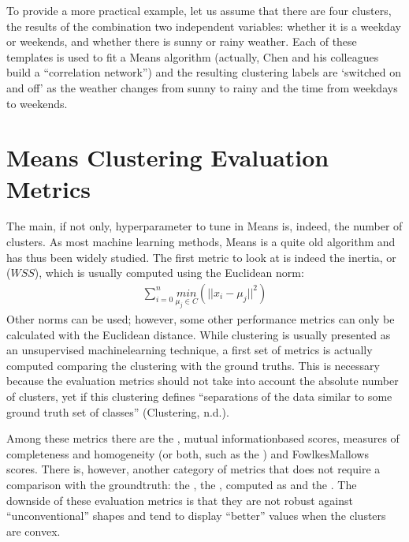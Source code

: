 \documentclass[letterpaper,10pt,english]{jupyterBook}
\begin{document}
\sphinxAtStartPar
To provide a more practical example, let us assume that there are four clusters, the results of the combination two independent variables: whether it is a weekday or weekends, and whether there is sunny or rainy weather. Each of these templates is used to fit a \sphinxhyphen{}Means algorithm (actually, Chen and his colleagues build a “correlation network”) and the resulting clustering labels are ‘switched on and off’ as the weather changes from sunny to rainy and the time from weekdays to weekends.


\section{\sphinxhyphen{}Means Clustering Evaluation Metrics}
\label{\detokenize{04-stations_kmeans:k-means-clustering-evaluation-metrics}}
\sphinxAtStartPar
The main, if not only, hyperparameter to tune in \sphinxhyphen{}Means is, indeed, the number of clusters.
As most machine learning methods, \sphinxhyphen{}Means is a quite old algorithm and has thus been widely studied.
The first metric to look at is indeed the inertia, or  (\(WSS\)), which is usually computed using the Euclidean norm:
\begin{equation*}
\begin{split}
\sum_{i=0}^{n}\underset{\mu_{j}\in{C}}{min}(||x_{i} - \mu_{j}||^2)
\end{split}
\end{equation*}
\sphinxAtStartPar
Other norms can be used; however, some other performance metrics can only be calculated with the Euclidean distance. While clustering is usually presented as an unsupervised machine\sphinxhyphen{}learning technique, a first set of metrics is actually computed comparing the clustering with the ground truths. This is necessary because the evaluation metrics should not take into account the absolute number of clusters, yet if this clustering defines “separations of the data similar to some ground truth set of classes” (Clustering, n.d.).

\sphinxAtStartPar
Among these metrics there are the , mutual information\sphinxhyphen{}based scores, measures of completeness and homogeneity (or both, such as the ) and Fowlkes\sphinxhyphen{}Mallows scores. There is, however, another category of metrics that does not require a comparison with the ground\sphinxhyphen{}truth: the , the , computed as  and  the . The downside of these evaluation metrics is that they are not robust against “unconventional” shapes and tend to display “better” values when the clusters are convex.
\end{document}
